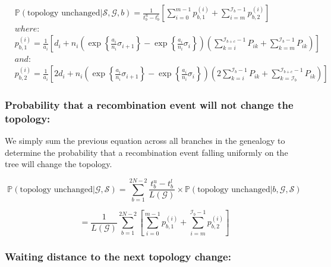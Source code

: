 \documentclass[11pt]{article}
\begin{document}
\begin{equation}
\begin{aligned}
    &\mathbb{P}(\textrm{topology unchanged} | \mathcal{S},\mathcal{G},b) = 
    \frac{1}{t_b^u-t_b^l}\left[\sum_{i=0}^{m-1}p_{b,1}^{(i)}+\sum_{i=m}^{\mathcal{I}_b-1}p_{b,2}^{(i)}\right] \\
    &where: \\
    &p_{b,1}^{(i)} = \frac{1}{a_i}\left[d_i+n_i\left(\exp\left\{\frac{a_i}{n_i}\sigma_{i+1}\right\}-\exp\left\{\frac{a_i}{n_i}\sigma_i\right\}\right)\left(\sum_{k=i}^{\mathcal{I}_{b+c}-1}P_{ik}+\sum_{k=m}^{\mathcal{I}_b-1}P_{ik}\right)\right] \\
    &and: \\
    &p_{b,2}^{(i)} = \frac{1}{a_i}\left[2d_i + n_i\left(\exp\left\{\frac{a_i}{n_i}\sigma_{i+1}\right\}-\exp\left\{\frac{a_i}{n_i}\sigma_{i}\right\}\right)\left(2\sum_{k=i}^{\mathcal{I}_b-1}P_{ik}+\sum_{k=\mathcal{I}_b}^{\mathcal{I}_{b+c}-1}P_{ik}\right)\right]
    \end{aligned}
\end{equation}

\subsubsection{Probability that a recombination event will not change the topology:}

We simply sum the previous equation across all branches in the genealogy to 
determine the probability that a recombination event falling uniformly on the 
tree will change the topology.

\begin{equation*}
    \mathbb{P}(\textrm{topology unchanged}| \mathcal{G},\mathcal{S}) = \sum_{b=1}^{2N-2}\frac{t_b^u-t_b^l}{L(\mathcal{G})} \times \mathbb{P}(\textrm{topology unchanged}|b, \mathcal{G},\mathcal{S})
\end{equation*}

\begin{equation}
    = \frac{1}{L(\mathcal{G})}\sum_{b=1}^{2N-2}\left[\sum_{i=0}^{m-1}p_{b,1}^{(i)}+\sum_{i=m}^{\mathcal{I}_b-1}p_{b,2}^{(i)}\right]
\end{equation}

\subsubsection{Waiting distance to the next topology change:}
\end{document}
